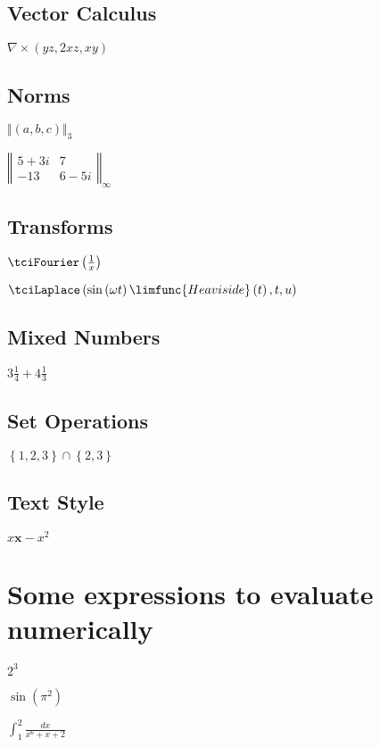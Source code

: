 \documentclass{article}
\begin{document}
\subsection{Vector Calculus}

$\nabla \times (yz,2xz,xy)$

\subsection{Norms}

$\Vert \left( a,b,c\right) \Vert _{3}$

$\left\Vert 
\begin{array}{cc}
5+3i & 7 \\ 
-13 & 6-5i%
\end{array}%
\right\Vert _{\infty }$

\subsection{Transforms}

$\tciFourier \left( \frac{1}{x}\right) $

$\tciLaplace \left( \sin \left( \omega t\right) \limfunc{Heaviside}\left(
t\right) ,t,u\right) $

\subsection{Mixed Numbers}

$3\frac{1}{4}+4\frac{1}{3}$

\subsection{Set Operations}

$\left\{ 1,2,3\right\} \cap \left\{ 2,3\right\} $

\subsection{Text Style}

$x\mathbf{x}-x^{2}$

\section{Some expressions to evaluate numerically}

$2^{3}$

$\sin \left( \pi ^{2}\right) $

$\int_{1}^{2}\frac{dx}{x^{6}+x+2}$
\end{document}
